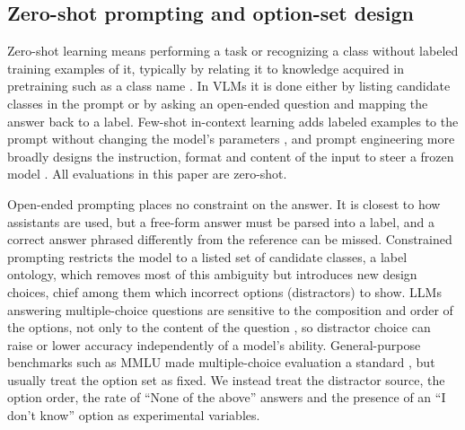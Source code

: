 \documentclass[10pt,letterpaper]{article}
\begin{document}
\subsection{Zero-shot prompting and option-set design}
\label{sec:background_prompting}
Zero-shot learning means performing a task or recognizing a class without labeled training examples of it, typically by relating it to knowledge acquired in pretraining such as a class name \cite{xian_zero-shot_2019}. In VLMs it is done either by listing candidate classes in the prompt or by asking an open-ended question and mapping the answer back to a label. Few-shot in-context learning adds labeled examples to the prompt without changing the model's parameters \cite{brown_language_2020, gu_systematic_2023}, and prompt engineering more broadly designs the instruction, format and content of the input to steer a frozen model \cite{sahoo_systematic_2024, schulhoff_prompt_2024}. All evaluations in this paper are zero-shot.

Open-ended prompting places no constraint on the answer. It is closest to how assistants are used, but a free-form answer must be parsed into a label, and a correct answer phrased differently from the reference can be missed. Constrained prompting restricts the model to a listed set of candidate classes, a label ontology, which removes most of this ambiguity but introduces new design choices, chief among them which incorrect options (distractors) to show. LLMs answering multiple-choice questions are sensitive to the composition and order of the options, not only to the content of the question \cite{pezeshkpour_large_2023}, so distractor choice can raise or lower accuracy independently of a model's ability. General-purpose benchmarks such as MMLU made multiple-choice evaluation a standard \cite{hendrycks_measuring_2021}, but usually treat the option set as fixed. We instead treat the distractor source, the option order, the rate of ``None of the above'' answers and the presence of an ``I don't know'' option as experimental variables.
\end{document}
